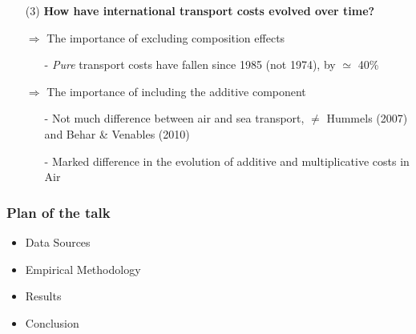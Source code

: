 \documentclass[10 pt,Helvetica, french]{beamer}
\begin{document}
\begin{frame}
\begin{itemize}
\item[(3)] \textbf{ How have international transport costs evolved over time?} \vspace{0.2cm}
\item[$\Rightarrow$] The importance of excluding composition effects \vspace{0.2cm}
\begin{itemize}
\item[-]\textit{Pure} transport costs have fallen since 1985 (not 1974), by $\simeq$ 40\% \vspace{0.2cm}
\end{itemize}
\item[$\Rightarrow$] The importance of including the additive component \vspace{0.2cm}
\begin{itemize}
\item[-] Not much difference between air and sea transport, $\neq$ Hummels (2007) and Behar \& Venables (2010) \vspace{0.2cm}
\item[-] Marked difference in the evolution of additive and multiplicative costs in Air
\end{itemize}
\end{itemize}
\end{frame}

\begin{frame}
\frametitle{Plan of the talk}
\begin{itemize}
\item Data Sources  \vspace{0.2cm}
\item Empirical Methodology \vspace{0.2cm}
\item Results \vspace{0.2cm}
\item Conclusion
\end{itemize}
\end{frame}
\end{document}
